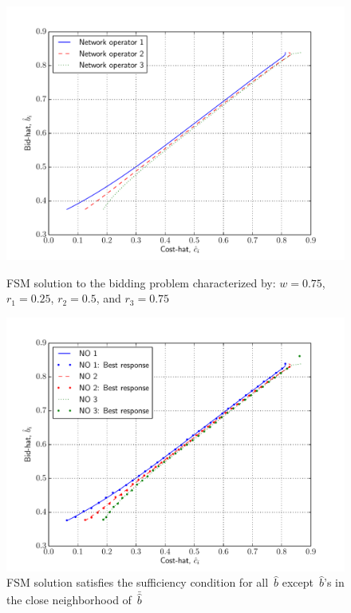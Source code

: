 \begin{figure}[p!]
  \includegraphics[width=\figsize]{Indirect/Figures/forward_shooting_3}
  \caption{FSM solution to the bidding problem characterized by: $w=0.75$, $r_1 = 0.25$, $r_2 = 0.5$, and $r_3 = 0.75$}
  \label{fig:forward_shooting_3_indirect}
  \vspace{10mm}
  \includegraphics[width=\figsize]{Indirect/Figures/forward_shooting_3_sufficiency}
  \caption{FSM solution satisfies the sufficiency condition for all~$\hat{b}$ except~$\hat{b}$'s in the close neighborhood of~$\bar{\hat{b}}$}
  \label{fig:forward_shooting_3_sufficiency_indirect}
\end{figure}


